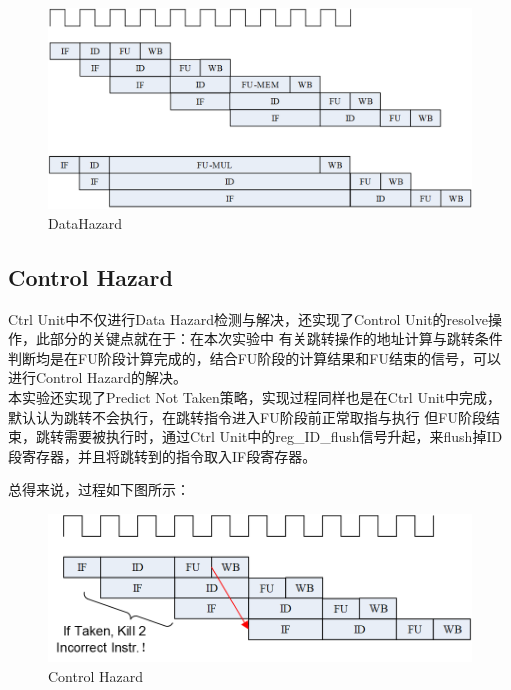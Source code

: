 \begin{figure}[H] %
	\centering %
	\includegraphics[width=1.0\textwidth]{figs/DataHazard.png} %
	\caption{DataHazard} %
	\label{Fig.2} %
\end{figure}

\subsection{Control Hazard}
Ctrl Unit中不仅进行Data Hazard检测与解决，还实现了Control Unit的resolve操作，此部分的关键点就在于：在本次实验中
有关跳转操作的地址计算与跳转条件判断均是在FU阶段计算完成的，结合FU阶段的计算结果和FU结束的信号，可以进行Control Hazard的解决。\\

本实验还实现了Predict Not Taken策略，实现过程同样也是在Ctrl Unit中完成，默认认为跳转不会执行，在跳转指令进入FU阶段前正常取指与执行
但FU阶段结束，跳转需要被执行时，通过Ctrl Unit中的reg\_ID\_flush信号升起，来flush掉ID段寄存器，并且将跳转到的指令取入IF段寄存器。

总得来说，过程如下图所示：

\begin{figure}[H] %
	\centering %
	\includegraphics[width=1.0\textwidth]{figs/Branch.png} %
	\caption{Control Hazard} %
	\label{Fig.3} %
\end{figure}

